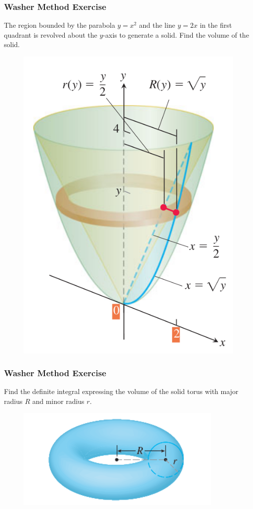 \documentclass[xcolor=dvipsnames]{beamer}
\begin{document}
\begin{frame}
  \frametitle{Washer Method Exercise}
{\ubung} The region bounded by the parabola $y=x^{2}$ and the line
$y=2x$ in the first quadrant is revolved about the $y$-axis to
generate a solid. Find the volume of the solid.
\begin{figure}[h]
  \includegraphics[scale=0.25]{./diagrams/radii.png}
\end{figure}
\end{frame}

\begin{frame}
  \frametitle{Washer Method Exercise}
  {\ubung} Find the definite integral expressing the volume of the
  solid torus with major radius $R$ and minor radius $r$.
\begin{figure}[h]
  \includegraphics[scale=0.6]{./diagrams/torus.png}
\end{figure}
\end{frame}
\end{document}
